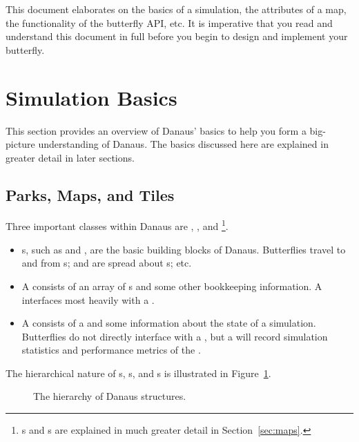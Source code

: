 \documentclass{pset}
\begin{document}
This document elaborates on the basics of a simulation, the attributes of a
map, the functionality of the butterfly API, etc. It is imperative that you
read and understand this document in full before you begin to design and
implement your butterfly.
\fi
\fi

\ifx \SIMULATIONBASICS \undefined \else
\section{Simulation Basics}
This section provides an overview of Danaus' basics to help you form a
big-picture understanding of Danaus. The basics discussed here are explained in
greater detail in later sections. 
\ifx \PARKSMAPSTILES \undefined \else
\subsection{Parks, Maps, and Tiles}
Three important classes within Danaus are , , and
\footnote{s and s are explained in much greater
detail in Section~\ref{sec:maps}.}. 
\begin{itemize}
    \item {}s, such as  and , are the basic
      building blocks of Danaus. Butterflies travel to and from s;
       and  are spread about s; etc.
    \item A  consists of an array of s and some other
      bookkeeping information. A  interfaces most heavily with
      a . 
    \item A  consists of a  and some information about the
      state of a simulation. Butterflies do not directly interface with a
      , but a  will record simulation statistics and
      performance metrics of the .  
\end{itemize}

The hierarchical nature of s, s, and s is
illustrated in Figure~\ref{fig:tileparkmap}.

\begin{figure}[h]
  \centering
  
  \def\firstcircle{(0,0) circle (1cm)}
  \def\secondcircle{(0,0) circle (2cm)}
  \def\thirdcircle{(0,0) circle (3cm)}

  \caption{The hierarchy of Danaus structures.}
  \label{fig:tileparkmap}
\end{figure}
\fi
\end{document}
